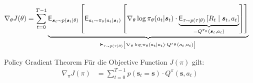 \documentclass[a4paper, 12pt]{scrartcl}
\begin{document}
\begin{beweis}
\begin{itemize}
        \begin{align*}
            \nabla_{\theta} J(\theta)
            &=
            \sum_{t=0}^{T-1}
            \underbrace{
                \mathsf{E}_{\bm{s}_t \sim p(\bm{s}_t \mid \theta)}
                \left[
                    \mathsf{E}_{a_t \sim \pi_\theta(a_t|\bm{s}_t)}
                    \left[
                        \vphantom{\int}
                        \nabla_{\theta} \log \pi_{\theta}(a_t|\bm{s}_t) \cdot
                        \underbrace{
                            \mathsf{E}_{\tau \sim p(\tau|\theta)}
                            \left[
                                R_{t}  \mid \bm{s}_t , a_t
                            \right]
                        }_{
                            = Q^{\pi_{\theta}}(\bm{s}_t , a_t)
                        }
                    \right]
                \right]
            }_{
                \mathsf{E}_{\tau \sim p(\tau|\theta)}
                \left[
                    \vphantom{\int}
                    \nabla_{\theta} \log \pi_{\theta}(a_t|\bm{s}_t) \cdot
                    Q^{\pi_{\theta}}(\bm{s}_t , a_t)
                \right]
            }
        \end{align*}
    \end{itemize}
\end{beweis}

\begin{satz}{Policy Gradient Theorem}
    Für die Objective Function $J(\pi)$ gilt:
    \begin{align*}
        \nabla_{\pi} J(\pi)
        &=
        \sum_{t=0}^{T-1}
        p(\bm{s}_t = \bm{s}) 
        \cdot Q^{\pi}(\bm{s}, a_t)
    \end{align*}
\end{satz}
\end{document}
